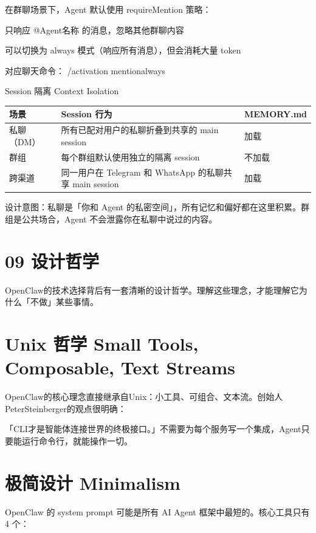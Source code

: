 \documentclass[
  10
]{article}
\newcounter{none} %
\begin{document}
在群聊场景下，Agent 默认使用 requireMention 策略：

只响应 @Agent名称 的消息，忽略其他群聊内容

可以切换为 always 模式（响应所有消息），但会消耗大量 token

对应聊天命令： /activation mention\textbar always

Session 隔离 Context Isolation

{\def\LTcaptype{none} %
\begin{longtable}[]{@{}|l|l|l|@{}}
\toprule\noalign{}
\endhead
\bottomrule\noalign{}
\endlastfoot
\hline
场景 & Session 行为 & MEMORY.md \\
\hline
私聊（DM） & 所有已配对用户的私聊折叠到共享的 main session & 加载 \\
\hline
群组 & 每个群组默认使用独立的隔离 session & 不加载 \\
\hline
跨渠道 & 同一用户在 Telegram 和 WhatsApp 的私聊共享 main session &
加载 \\
\hline
\end{longtable}
}

设计意图：私聊是「你和 Agent
的私密空间」，所有记忆和偏好都在这里积累。群组是公共场合，Agent
不会泄露你在私聊中说过的内容。

\section{09 设计哲学}\label{ux8bbeux8ba1ux54f2ux5b66}

OpenClaw的技术选择背后有一套清晰的设计哲学。理解这些理念，才能理解它为什么「不做」某些事情。

\section{Unix 哲学 Small Tools, Composable, Text
Streams}\label{unix-ux54f2ux5b66-small-tools-composable-text-streams}

OpenClaw的核心理念直接继承自Unix：小工具、可组合、文本流。创始人PeterSteinberger的观点很明确：

「CLI才是智能体连接世界的终极接口。」不需要为每个服务写一个集成，Agent只要能运行命令行，就能操作一切。

\section{极简设计 Minimalism}\label{ux6781ux7b80ux8bbeux8ba1-minimalism}

OpenClaw 的 system prompt 可能是所有 AI Agent 框架中最短的。核心工具只有
4 个：
\end{document}
